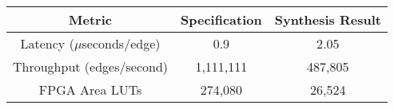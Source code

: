 \begin{table}[H]
\begin{center}
\begin{tabular}{|c|c|c|}
    \hline
    \textbf{Metric}             & \textbf{Specification} & \textbf{Synthesis Result} \\
    \hline
    Latency ($\mu$seconds/edge)  &   0.9  & \textcolor{myred}{2.05} \\
    \hline
    Throughput (edges/second)  &   1,111,111 & \textcolor{myred}{487,805} \\
    \hline
    FPGA Area \glspl{LUT} & 274,080  & \textcolor{mygreen}{26,524} \\
    \hline
\end{tabular}
\label{table:HBB_results}
\end{center}
\end{table}